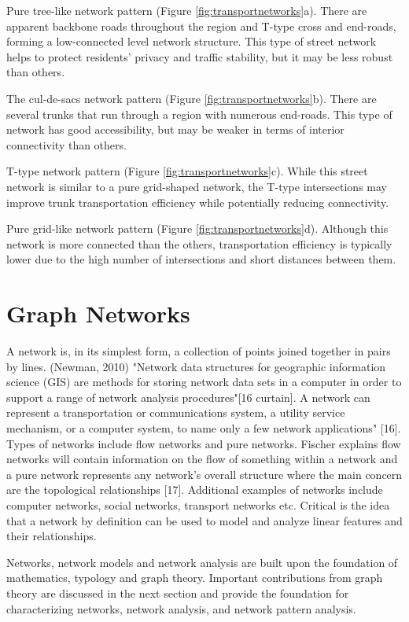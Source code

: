 Pure tree-like network pattern (Figure \ref{fig:transportnetworks}a). There are apparent backbone roads throughout the region and T-type cross and end-roads, forming a low-connected level network structure. This type of street network helps to protect residents' privacy and traffic stability, but it may be less robust than others.

The cul-de-sacs network pattern (Figure \ref{fig:transportnetworks}b). There are several trunks that run through a region with numerous end-roads. This type of network has good accessibility, but may be weaker in terms of interior connectivity than others.

T-type network pattern (Figure \ref{fig:transportnetworks}c). While this street network is similar to a pure grid-shaped network, the T-type intersections may improve trunk transportation efficiency while potentially reducing connectivity.

Pure grid-like network pattern (Figure \ref{fig:transportnetworks}d). Although this network is more connected than the others, transportation efficiency is typically lower due to the high number of intersections and short distances between them.

\section{Graph Networks}
A network is, in its simplest form, a collection of points joined together in pairs by lines. (Newman, 2010) "Network data structures for geographic information science (GIS) are methods for storing network data sets in a computer in order to support a range of network analysis procedures"[16 curtain]. A network can represent a transportation or communications system, a utility service mechanism, or a computer system, to name only a few network applications" [16]. Types of networks include flow networks and pure networks. Fischer explains flow networks will contain information on the flow of something within a network and a pure network represents any network's overall structure where the main concern are the topological relationships [17]. Additional examples of networks include computer networks, social networks, transport networks etc. Critical is the idea that a network by definition can be used to model and analyze linear features and their relationships. 

Networks, network models and network analysis are built upon the foundation of mathematics, typology and graph theory. Important contributions from graph theory are discussed in the next section and provide the foundation for characterizing networks, network analysis, and network pattern analysis.

